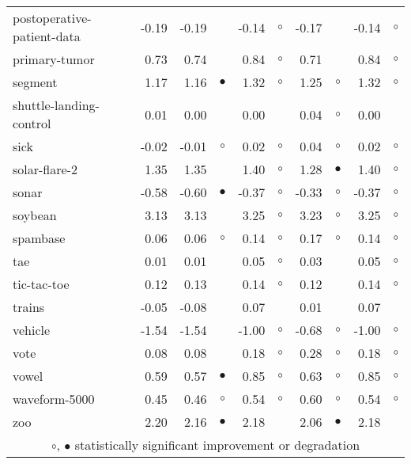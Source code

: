 {\begin{longtable}{lrr@{\hspace{0.1cm}}cr@{\hspace{0.1cm}}cr@{\hspace{0.1cm}}cr@{\hspace{0.1cm}}c}
postoperative-patient-data & -0.19 & -0.19 &           & -0.14 &   $\circ$ & -0.17 &            & -0.14 &   $\circ$\\
primary-tumor &  0.73 &  0.74 &           &  0.84 &   $\circ$ &  0.71 &            &  0.84 &   $\circ$\\
segment &  1.17 &  1.16 & $\bullet$ &  1.32 &   $\circ$ &  1.25 &    $\circ$ &  1.32 &   $\circ$\\
shuttle-landing-control &  0.01 &  0.00 &           &  0.00 &           &  0.04 &    $\circ$ &  0.00 &          \\
sick & -0.02 & -0.01 &   $\circ$ &  0.02 &   $\circ$ &  0.04 &    $\circ$ &  0.02 &   $\circ$\\
solar-flare-2 &  1.35 &  1.35 &           &  1.40 &   $\circ$ &  1.28 &  $\bullet$ &  1.40 &   $\circ$\\
sonar & -0.58 & -0.60 & $\bullet$ & -0.37 &   $\circ$ & -0.33 &    $\circ$ & -0.37 &   $\circ$\\
soybean &  3.13 &  3.13 &           &  3.25 &   $\circ$ &  3.23 &    $\circ$ &  3.25 &   $\circ$\\
spambase &  0.06 &  0.06 &   $\circ$ &  0.14 &   $\circ$ &  0.17 &    $\circ$ &  0.14 &   $\circ$\\
tae &  0.01 &  0.01 &           &  0.05 &   $\circ$ &  0.03 &            &  0.05 &   $\circ$\\
tic-tac-toe &  0.12 &  0.13 &           &  0.14 &   $\circ$ &  0.12 &            &  0.14 &   $\circ$\\
trains & -0.05 & -0.08 &           &  0.07 &           &  0.01 &            &  0.07 &          \\
vehicle & -1.54 & -1.54 &           & -1.00 &   $\circ$ & -0.68 &    $\circ$ & -1.00 &   $\circ$\\
vote &  0.08 &  0.08 &           &  0.18 &   $\circ$ &  0.28 &    $\circ$ &  0.18 &   $\circ$\\
vowel &  0.59 &  0.57 & $\bullet$ &  0.85 &   $\circ$ &  0.63 &    $\circ$ &  0.85 &   $\circ$\\
waveform-5000 &  0.45 &  0.46 &   $\circ$ &  0.54 &   $\circ$ &  0.60 &    $\circ$ &  0.54 &   $\circ$\\
zoo &  2.20 &  2.16 & $\bullet$ &  2.18 &           &  2.06 &  $\bullet$ &  2.18 &          \\
\hline
\multicolumn{10}{c}{$\circ$, $\bullet$ statistically significant improvement or degradation}\\
\end{longtable} \footnotesize \par}
